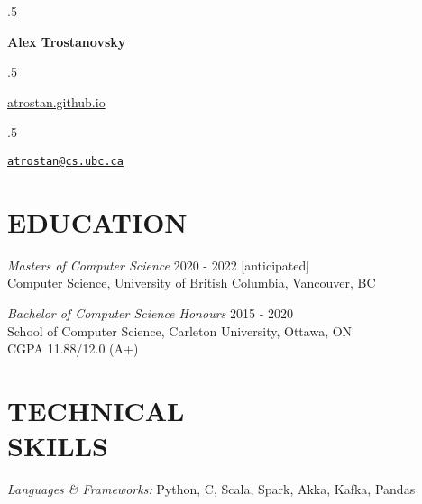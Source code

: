 \documentclass[margin]{res}
\newcommand{\CC}{C\nolinebreak\hspace{-.05em}\raisebox{.4ex}{\tiny\bf +}\nolinebreak\hspace{-.10em}\raisebox{.4ex}{\tiny\bf +}}
\begin{document}
\moveleft.5\hoffset\centerline{\large\bf Alex Trostanovsky}
\moveleft.5\hoffset\centerline{
      {\href{https://atrostan.github.io/}{\textsf{atrostan.github.io}}}      
      \textbullet{}
      \textbullet{}}

\moveleft.5\hoffset\centerline{
{ \tt \href{mailto:atrostan@cs.ubc.ca}{atrostan@cs.ubc.ca}}}
\begin{resume}


\section{EDUCATION} 

{\sl Masters of Computer Science}  \hfill 2020 - 2022 [anticipated]\\
Computer Science, University of British Columbia, Vancouver, BC

{\sl Bachelor of Computer Science Honours}  \hfill 2015 - 2020\\
School of Computer Science, Carleton University, Ottawa, ON \\
CGPA 11.88/12.0 (A+)\\

\section{TECHNICAL \\ SKILLS} {\sl Languages \& Frameworks:} Python, \CC, Scala, Spark, Akka, Kafka, Pandas 


\end{resume}
\end{document}
